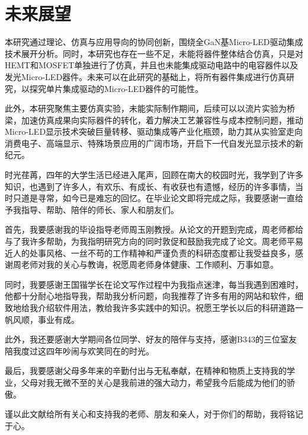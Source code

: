 \documentclass[
    oneside,                %
    fontset = win, %
  ]{njuthesis}
\begin{document}
\section{未来展望}

本研究通过理论、仿真与应用导向的协同创新，围绕全GaN基Micro-LED驱动集成技术展开分析。同时，本研究也存在一些不足，未能将器件整体结合仿真，只是对HEMT和MOSFET单独进行了仿真，并且也未能集成驱动电路中的电容器件以及发光Micro-LED器件。未来可以在此研究的基础上，将所有器件集成进行仿真研究，以探究单片集成驱动的Micro-LED器件的可能性。

此外，本研究聚焦主要仿真实验，未能实际制作期间，后续可以以流片实验为桥梁，加速仿真成果向实际器件的转化，着力解决工艺兼容性与成本控制问题，推动Micro-LED显示技术突破巨量转移、驱动集成等产业化瓶颈，助力其从实验室走向消费电子、高端显示、特殊场景应用的广阔市场，开启下一代自发光显示技术的新纪元。



\printbibliography


\begin{acknowledgement}

时光荏苒，四年的大学生活已经进入尾声，回顾在南大的校园时光，我学到了许多知识，也遇到了许多人，有欢乐、有成长、有收获也有遗憾，经历的许多事情，当时只道是寻常，如今已是难忘的回忆。在毕业论文即将完成之际，我要感谢一直给予我指导、帮助、陪伴的师长、家人和朋友们。

首先，我要感谢我的毕设指导老师周玉刚教授。从论文的开题到完成，周老师都给与了我许多帮助，为我指明研究方向的同时敦促和鼓励我完成了论文。周老师平易近人的处事风格、一丝不苟的工作精神和严谨负责的科研态度都让我受益良多，感谢周老师对我的关心与教诲，祝愿周老师身体健康、工作顺利、万事如意。

同时，我要感谢王国锴学长在论文写作过程中为我指点迷津，每当我遇到困难时，他都十分耐心地指导我，帮助我分析问题，向我推荐了许多有用的网站和软件，细致地给我介绍软件用法，教给我许多实践中的知识。祝愿王学长以后的科研道路一帆风顺，事业有成。

此外，我还要感谢大学期间各位同学、好友的陪伴与支持，感谢B343的三位室友陪我度过这四年吵闹与欢笑同在的时光。

最后，我要感谢父母多年来的辛勤付出与无私奉献，在精神和物质上支持我的学业，父母对我无微不至的关心是我前进的强大动力，希望我今后能成为他们的骄傲。

谨以此文献给所有关心和支持我的老师、朋友和亲人，对于你们的帮助，我将铭记于心。

\end{acknowledgement}
\end{document}
